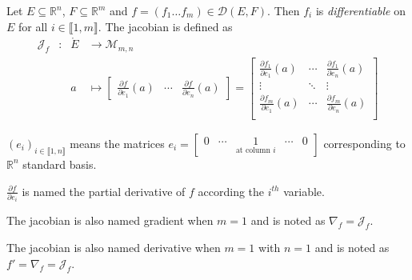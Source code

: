 \documentclass[11pt,en]{elegantpaper}
\newcommand{\Real}{\mathbb{R}}
\begin{document}
\begin{definition}
  Let $E \subseteq \Real^n$, $F \subseteq \Real^m$ and $f = (f_1 \ldots f_m) \in \mathcal{D}(E,F)$.
  Then $f_i$ is \textit{differentiable} on $E$ for all $i \in \llbracket 1,m \rrbracket$. The jacobian is defined as \begin{equation}
    \begin{array}{llll}
      \mathcal{J}_f & : & \mathring{E} & \longrightarrow \mathcal{M}_{m,n} \\
        &   & a & \longmapsto \begin{bmatrix}
        \frac{\partial f}{\partial e_1}(a) & \cdots & \frac{\partial f}{\partial e_n}(a)
      \end{bmatrix} = \begin{bmatrix}
        \frac{\partial f_1}{\partial e_1}(a) & \cdots & \frac{\partial f_1}{\partial e_n}(a) \\
        \vdots & \ddots & \vdots \\
        \frac{\partial f_m}{\partial e_1}(a) & \cdots & \frac{\partial f_m}{\partial e_n}(a) \\
      \end{bmatrix}
    \end{array}
  \end{equation}

  $(e_i)_{i \in \llbracket 1,n \rrbracket}$ means the matrices $e_i = \begin{bmatrix}
    0 & \cdots & \underset{\text{at column $i$}} 1 & \cdots & 0
  \end{bmatrix}$ corresponding to $\Real^n$ standard basis. \par
  $\frac{\partial f}{\partial e_i}$ is named the partial derivative of $f$ according the $i^{th}$ variable. \par
  The jacobian is also named gradient when $m=1$ and is noted as $\nabla_f = \mathcal{J}_f$. \par
  The jacobian is also named derivative when $m=1$ with $n=1$ and is noted as $f' = \nabla_f = \mathcal{J}_f$.
\end{definition}
\end{document}

